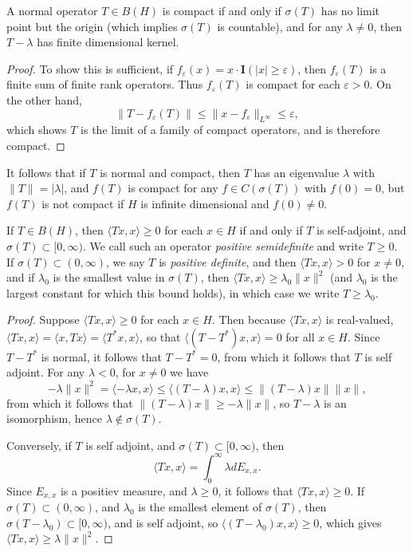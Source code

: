 \begin{theorem}
    A normal operator $T \in B(H)$ is compact if and only if $\sigma(T)$ has no limit point but the origin (which implies $\sigma(T)$ is countable), and for any $\lambda \neq 0$, then $T - \lambda$ has finite dimensional kernel.
\end{theorem}
\begin{proof}
    To show this is sufficient, if $f_\varepsilon(x) = x \cdot \mathbf{I}(|x| \geq \varepsilon)$, then $f_\varepsilon(T)$ is a finite sum of finite rank operators. Thus $f_\varepsilon(T)$ is compact for each $\varepsilon > 0$. On the other hand,
    \[ \| T - f_\varepsilon(T) \| \leq \| x - f_\varepsilon \|_{L^\infty} \leq \varepsilon, \]
    which shows $T$ is the limit of a family of compact operators, and is therefore compact.
\end{proof}

It follows that if $T$ is normal and compact, then $T$ has an eigenvalue $\lambda$ with $\| T \| = |\lambda|$, and $f(T)$ is compact for any $f \in C(\sigma(T))$ with $f(0) = 0$, but $f(T)$ is not compact if $H$ is infinite dimensional and $f(0) \neq 0$.

\begin{theorem}
    If $T \in B(H)$, then $\langle Tx, x \rangle \geq 0$ for each $x \in H$ if and only if $T$ is self-adjoint, and $\sigma(T) \subset [0,\infty)$. We call such an operator \emph{positive semidefinite} and write $T \geq 0$. If $\sigma(T) \subset (0,\infty)$, we say $T$ is \emph{positive definite}, and then $\langle Tx, x \rangle > 0$ for $x \neq 0$, and if $\lambda_0$ is the smallest value in $\sigma(T)$, then $\langle Tx, x \rangle \geq \lambda_0 \| x \|^2$ (and $\lambda_0$ is the largest constant for which this bound holds), in which case we write $T \geq \lambda_0$.
\end{theorem}
\begin{proof}
    Suppose $\langle Tx,x \rangle \geq 0$ for each $x \in H$. Then because $\langle Tx, x \rangle$ is real-valued, $\langle Tx, x \rangle = \langle x, Tx \rangle = \langle T^* x, x \rangle$, so that $\langle (T - T^*) x, x \rangle = 0$ for all $x \in H$. Since $T - T^*$ is normal, it follows that $T - T^* = 0$, from which it follows that $T$ is self adjoint. For any $\lambda < 0$, for $x \neq 0$ we have
    \[ -\lambda \| x \|^2 = \langle -\lambda x, x \rangle \leq \langle (T-\lambda) x, x \rangle \leq \| (T - \lambda) x \| \| x \|, \]
    from which it follows that $\| (T - \lambda) x \| \geq - \lambda \| x \|$, so $T - \lambda$ is an isomorphism, hence $\lambda \not \in \sigma(T)$.

    Conversely, if $T$ is self adjoint, and $\sigma(T) \subset [0,\infty)$, then
    \[ \langle Tx, x \rangle = \int_0^\infty \lambda dE_{x,x}. \]
    Since $E_{x,x}$ is a positiev measure, and $\lambda \geq 0$, it follows that $\langle Tx,x\rangle \geq 0$. If $\sigma(T) \subset (0,\infty)$, and $\lambda_0$ is the smallest element of $\sigma(T)$, then $\sigma(T - \lambda_0) \subset [0,\infty)$, and is self adjoint, so $\langle (T - \lambda_0) x, x \rangle \geq 0$, which gives $\langle Tx, x \rangle \geq \lambda \| x \|^2$.
\end{proof}

